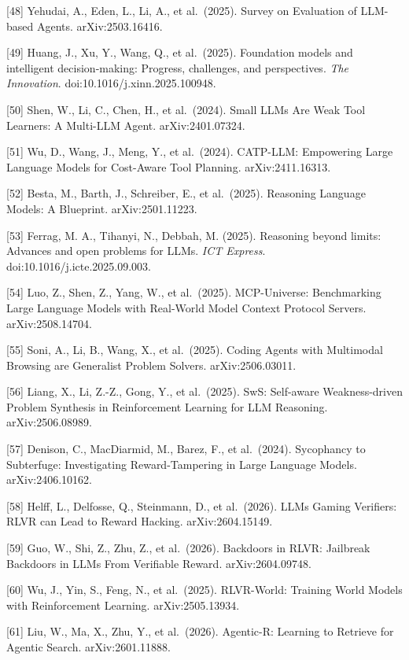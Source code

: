 {[}48{]} Yehudai, A., Eden, L., Li, A., et al.~(2025). Survey on Evaluation of LLM-based Agents. arXiv:2503.16416.

{[}49{]} Huang, J., Xu, Y., Wang, Q., et al.~(2025). Foundation models and intelligent decision-making: Progress, challenges, and perspectives. \emph{The Innovation}. doi:10.1016/j.xinn.2025.100948.

{[}50{]} Shen, W., Li, C., Chen, H., et al.~(2024). Small LLMs Are Weak Tool Learners: A Multi-LLM Agent. arXiv:2401.07324.

{[}51{]} Wu, D., Wang, J., Meng, Y., et al.~(2024). CATP-LLM: Empowering Large Language Models for Cost-Aware Tool Planning. arXiv:2411.16313.

{[}52{]} Besta, M., Barth, J., Schreiber, E., et al.~(2025). Reasoning Language Models: A Blueprint. arXiv:2501.11223.

{[}53{]} Ferrag, M. A., Tihanyi, N., Debbah, M. (2025). Reasoning beyond limits: Advances and open problems for LLMs. \emph{ICT Express}. doi:10.1016/j.icte.2025.09.003.

{[}54{]} Luo, Z., Shen, Z., Yang, W., et al.~(2025). MCP-Universe: Benchmarking Large Language Models with Real-World Model Context Protocol Servers. arXiv:2508.14704.

{[}55{]} Soni, A., Li, B., Wang, X., et al.~(2025). Coding Agents with Multimodal Browsing are Generalist Problem Solvers. arXiv:2506.03011.

{[}56{]} Liang, X., Li, Z.-Z., Gong, Y., et al.~(2025). SwS: Self-aware Weakness-driven Problem Synthesis in Reinforcement Learning for LLM Reasoning. arXiv:2506.08989.

{[}57{]} Denison, C., MacDiarmid, M., Barez, F., et al.~(2024). Sycophancy to Subterfuge: Investigating Reward-Tampering in Large Language Models. arXiv:2406.10162.

{[}58{]} Helff, L., Delfosse, Q., Steinmann, D., et al.~(2026). LLMs Gaming Verifiers: RLVR can Lead to Reward Hacking. arXiv:2604.15149.

{[}59{]} Guo, W., Shi, Z., Zhu, Z., et al.~(2026). Backdoors in RLVR: Jailbreak Backdoors in LLMs From Verifiable Reward. arXiv:2604.09748.

{[}60{]} Wu, J., Yin, S., Feng, N., et al.~(2025). RLVR-World: Training World Models with Reinforcement Learning. arXiv:2505.13934.

{[}61{]} Liu, W., Ma, X., Zhu, Y., et al.~(2026). Agentic-R: Learning to Retrieve for Agentic Search. arXiv:2601.11888.

